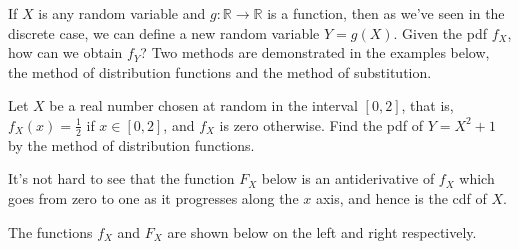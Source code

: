 If $X$ is any random variable and $g: \mathbb{R} \to \mathbb{R}$ is a function, then as we've seen in the discrete case, we can define a new random variable $Y = g(X)$. Given the pdf $f_X$, how can we obtain $f_Y$? Two methods are demonstrated in the examples below, the method of distribution functions and the method of substitution.

\begin{examp}\label{MethodDistributionEx}Let $X$ be a real number chosen at random in the interval $[0,2]$, that is, $f_X(x) = \frac{1}{2}$ if $x \in [0,2]$, and $f_X$ is zero otherwise. Find the pdf of $Y = X^2 + 1$ by the method of distribution functions.
\par
\noindent It's not hard to see that the function $F_X$ below is an antiderivative of $f_X$ which goes from zero to one as it progresses along the $x$ axis, and hence is the cdf of $X$.
\renewcommand*{\arraystretch}{1.35}
\renewcommand*{\arraystretch}{1}
\par
\noindent The functions $f_X$ and $F_X$ are shown below on the left and right respectively.


\end{examp}
